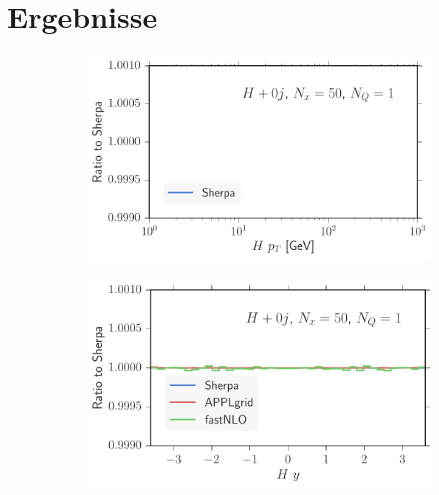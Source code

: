 
\chapter{Ergebnisse}
%
\begin{figure}
\centering
\begin{subfigure}[]{0.49\textwidth}
	\includegraphics[width=\textwidth]{images/hb_hpt.pdf}
\end{subfigure}
\begin{subfigure}[]{0.49\textwidth}
	\includegraphics[width=\textwidth]{images/hb_hy.pdf}
\end{subfigure}


\end{figure}

